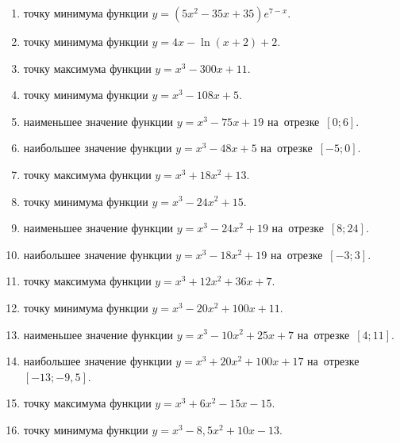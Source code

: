 \documentclass[a4paper,10pt]{article}
\begin{document}
\begin{enumerate}
\item {} точку минимума функции $y=\left(5x^2-35x+35\right){{e}^{7-x}}$.

\item {} точку минимума функции $y=4x-\ln \left(x+2\right)+2$.

\item {} точку максимума функции $y=x^3 -300x +11$.

\item {} точку минимума функции $y=x^3 -108x+5$.

\item {} наименьшее значение функции $y=x^3 -75x+19$ на~отрезке~$\left[0;6\right]$.

\item {} наибольшее значение функции $y=x^3 -48x+5$ на~отрезке~$\left[-5;0\right]$.

\item {} точку максимума функции $y=x^3 +18x^2+13$.

\item {} точку минимума функции $y=x^3 -24x^2+15$.

\item {} наименьшее значение функции $y=x^3 -24x^2+19$ на~отрезке~$\left[8;24\right]$.

\item {} наибольшее значение функции $y=x^3 -18x^2+19$ на~отрезке~$\left[-3;3\right]$.

\item {} точку максимума функции $y=x^3 +12x^2+36x+7$.

\item {} точку минимума функции $y=x^3 -20x^2+100x+11$.

\item {} наименьшее значение функции $y=x^3 -10x^2+25x+7$ на~отрезке~$\left[4;11\right]$.

\item {} наибольшее значение функции $y=x^3 +20x^2+100x+17$ на~отрезке~$\left[-13;-9,5\right]$.

\item {} точку максимума функции $y=x^3 +6x^2-15x-15$.

\item {} точку минимума функции $y=x^3 -8,5x^2+10x-13$.


\end{enumerate}
\end{document}
